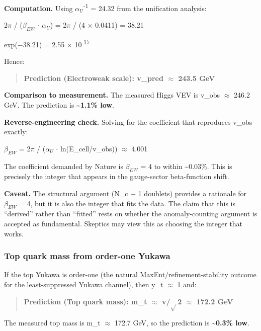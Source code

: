 \documentclass[11pt,a4paper]{article}
\theoremstyle{remark}
\begin{document}
\textbf{Computation.} Using $\alpha_U$\textsuperscript{-1} = 24.32 from the unification analysis:

2\ensuremath{\pi} / ($\beta_{EW}$ \ensuremath{\cdot} $\alpha_U$) = 2\ensuremath{\pi} / (4 \ensuremath{\times} 0.0411) = 38.21

exp(\ensuremath{-}38.21) = 2.55 \ensuremath{\times} 10\textsuperscript{-17}

Hence:

\begin{quote}
\textbf{Prediction (Electroweak scale): v\_pred \ensuremath{\approx} 243.5 GeV}
\end{quote}

\textbf{Comparison to measurement.} The measured Higgs VEV is v\_obs \ensuremath{\approx} 246.2 GeV.
The prediction is \textbf{\textasciitilde1.1\% low}.

\textbf{Reverse-engineering check.} Solving for the coefficient that reproduces v\_obs exactly:

$\beta_{EW}$ = 2\ensuremath{\pi} / ($\alpha_U$ \ensuremath{\cdot} ln(E\_cell/v\_obs)) \ensuremath{\approx} 4.001

The coefficient demanded by Nature is $\beta_{EW}$ = 4 to within \textasciitilde0.03\%. This is precisely the integer that appears in the gauge-sector beta-function shift.

\textbf{Caveat.} The structural argument (N\_c + 1 doublets) provides a rationale for $\beta_{EW}$ = 4, but it is also the integer that fits the data. The claim that this is ``derived'' rather than ``fitted'' rests on whether the anomaly-counting argument is accepted as fundamental. Skeptics may view this as choosing the integer that works.

\subsubsection{Top quark mass from order-one Yukawa}\label{top-quark-mass-from-order-one-yukawa}

If the top Yukawa is order-one (the natural MaxEnt/refinement-stability outcome for the least-suppressed Yukawa channel), then y\_t \ensuremath{\approx} 1 and:

\begin{quote}
\textbf{Prediction (Top quark mass): m\_t \ensuremath{\approx} v/\ensuremath{\sqrt{}}2 \ensuremath{\approx} 172.2 GeV}
\end{quote}

The measured top mass is m\_t \ensuremath{\approx} 172.7 GeV, so the prediction is \textbf{\textasciitilde0.3\% low}.
\end{document}
